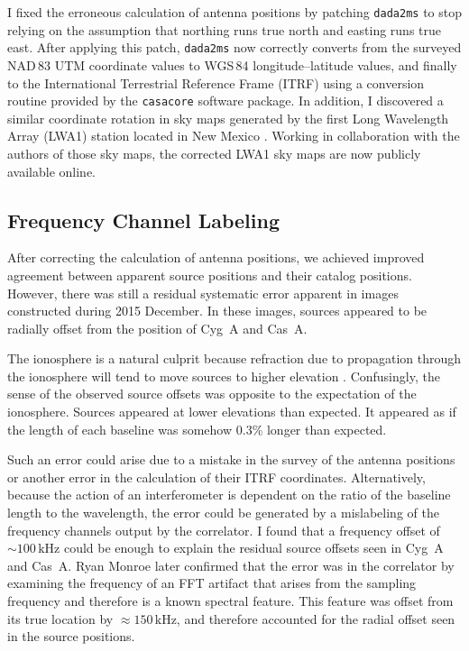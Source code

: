 \begin{bibunit}
I fixed the erroneous calculation of antenna positions by patching \texttt{dada2ms} to stop relying
on the assumption that northing runs true north and easting runs true east. After applying this
patch, \texttt{dada2ms} now correctly converts from the surveyed NAD\,83 UTM coordinate values to
WGS\,84 longitude--latitude values, and finally to the International Terrestrial Reference Frame
(ITRF) using a conversion routine provided by the \texttt{casacore} software package.  In addition,
I discovered a similar coordinate rotation in sky maps generated by the first Long Wavelength Array
(LWA1) station located in New Mexico \citep{2017MNRAS.469.4537D}. Working in collaboration with the
authors of those sky maps, the corrected LWA1 sky maps are now publicly available online.

\subsection{Frequency Channel Labeling}

After correcting the calculation of antenna positions, we achieved improved agreement between
apparent source positions and their catalog positions. However, there was still a residual
systematic error apparent in images constructed during 2015 December. In these images, sources
appeared to be radially offset from the position of Cyg~A and Cas~A.

The ionosphere is a natural culprit because refraction due to propagation through the ionosphere
will tend to move sources to higher elevation \citep[e.g.,][]{2014MNRAS.437.1056V}. Confusingly, the
sense of the observed source offsets was opposite to the expectation of the ionosphere. Sources
appeared at lower elevations than expected. It appeared as if the length of each baseline was
somehow 0.3\% longer than expected.

Such an error could arise due to a mistake in the survey of the antenna positions or another error
in the calculation of their ITRF coordinates. Alternatively, because the action of an interferometer
is dependent on the ratio of the baseline length to the wavelength, the error could be generated by
a mislabeling of the frequency channels output by the correlator. I found that a frequency offset of
$\sim 100\,\text{kHz}$ could be enough to explain the residual source offsets seen in Cyg~A and
Cas~A. Ryan Monroe later confirmed that the error was in the correlator by examining the frequency
of an FFT artifact that arises from the sampling frequency and therefore is a known spectral
feature. This feature was offset from its true location by $\approx150\,\text{kHz}$, and therefore
accounted for the radial offset seen in the source positions.


\end{bibunit}
